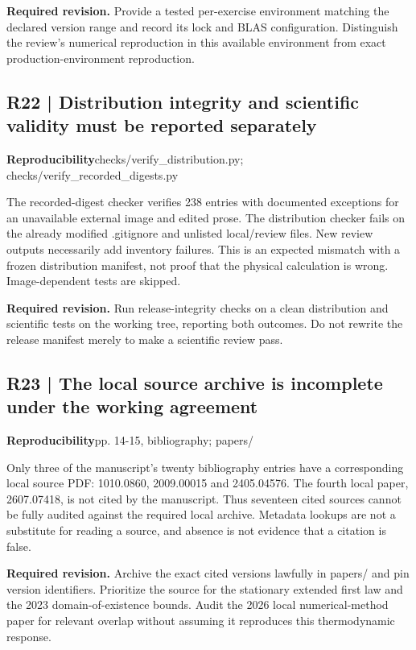 \documentclass[10pt,a4paper]{article}
\begin{document}
\textbf{Required revision.} Provide a tested per-exercise environment matching the declared version range and record its lock and BLAS configuration. Distinguish the review's numerical reproduction in this available environment from exact production-environment reproduction.

\subsection*{R22 | Distribution integrity and scientific validity must be reported separately}
\textbf{Reproducibility}\quad checks/verify\_distribution.py; checks/verify\_recorded\_digests.py

The recorded-digest checker verifies 238 entries with documented exceptions for an unavailable external image and edited prose. The distribution checker fails on the already modified .gitignore and unlisted local/review files. New review outputs necessarily add inventory failures. This is an expected mismatch with a frozen distribution manifest, not proof that the physical calculation is wrong. Image-dependent tests are skipped.

\textbf{Required revision.} Run release-integrity checks on a clean distribution and scientific tests on the working tree, reporting both outcomes. Do not rewrite the release manifest merely to make a scientific review pass.

\subsection*{R23 | The local source archive is incomplete under the working agreement}
\textbf{Reproducibility}\quad pp. 14-15, bibliography; papers/

Only three of the manuscript's twenty bibliography entries have a corresponding local source PDF: 1010.0860, 2009.00015 and 2405.04576. The fourth local paper, 2607.07418, is not cited by the manuscript. Thus seventeen cited sources cannot be fully audited against the required local archive. Metadata lookups are not a substitute for reading a source, and absence is not evidence that a citation is false.

\textbf{Required revision.} Archive the exact cited versions lawfully in papers/ and pin version identifiers. Prioritize the source for the stationary extended first law and the 2023 domain-of-existence bounds. Audit the 2026 local numerical-method paper for relevant overlap without assuming it reproduces this thermodynamic response.
\end{document}
